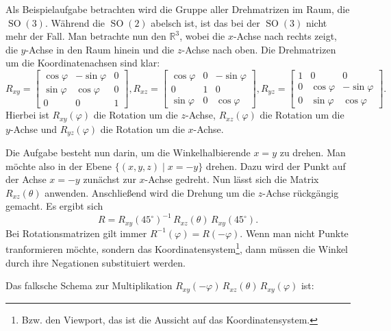 \documentclass[a4paper,11pt,fleqn,twoside]{scrartcl}
\numberwithin{equation}{section}
\newcommand{\R}{\mathbb R}
\theoremstyle{rmbox}
\begin{document}
Als Beispielaufgabe betrachten wird die Gruppe aller Drehmatrizen
im Raum, die $\operatorname{SO}(3)$. Während die $\operatorname{SO}(2)$
abelsch ist, ist das bei der $\operatorname{SO}(3)$ nicht mehr
der Fall. Man betrachte nun den $\R^3$, wobei die $x$-Achse nach
rechts zeigt, die $y$-Achse in den Raum hinein und die $z$-Achse
nach oben. Die Drehmatrizen um die Koordinatenachsen sind klar:
\begin{equation}
R_{xy} = \begin{bmatrix}
\cos\varphi & -\sin\varphi & 0\\
\sin\varphi & \cos\varphi & 0\\
0 & 0 & 1
\end{bmatrix},
R_{xz} = \begin{bmatrix}
\cos\varphi & 0 & -\sin\varphi\\
0 & 1 & 0\\
\sin\varphi & 0 & \cos\varphi
\end{bmatrix},
R_{yz} = \begin{bmatrix}
1 & 0 & 0\\
0 & \cos\varphi & -\sin\varphi\\
0 & \sin\varphi & \cos\varphi
\end{bmatrix}.
\end{equation}
Hierbei ist $R_{xy}(\varphi)$ die Rotation um die $z$-Achse,
$R_{xz}(\varphi)$ die Rotation um die $y$-Achse und
$R_{yz}(\varphi)$ die Rotation um die $x$-Achse.

Die Aufgabe besteht nun darin, um die Winkelhalbierende $x=y$ zu
drehen. Man möchte also in der Ebene $\{(x,y,z)\mid x=-y\}$ drehen.
Dazu wird der Punkt auf der Achse $x=-y$ zunächst zur $x$-Achse
gedreht. Nun lässt sich die Matrix $R_{xz}(\theta)$ anwenden.
Anschließend wird die Drehung um die $z$-Achse rückgängig gemacht.
Es ergibt sich
\begin{equation}
R = R_{xy}(45^\circ)^{-1}\,R_{xz}(\theta)\,R_{xy}(45^\circ).
\end{equation}
Bei Rotationsmatrizen gilt immer $R^{-1}(\varphi)=R(-\varphi)$.
Wenn man nicht Punkte tranformieren möchte, sondern das
Koordinatensystem\footnote{Bzw. den Viewport, das ist die Aussicht
auf das Koordinatensystem.}, dann müssen die Winkel durch ihre
Negationen substituiert werden.

Das falksche Schema zur Multiplikation
$R_{xy}(-\varphi)\,R_{xz}(\theta)\,R_{xy}(\varphi)$ ist:
\end{document}

